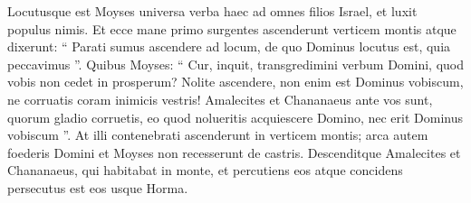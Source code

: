 \begin{biblechapter}
\begin{biblechapter}
\begin{biblechapter}
\begin{biblechapter}
\begin{biblechapter}
\begin{biblechapter}
\begin{biblechapter}
\begin{biblechapter}
\begin{biblechapter}
\begin{biblechapter}
\begin{biblechapter}
\begin{biblechapter}
\begin{biblechapter}
\begin{biblechapter}
 \verse Locutusque est Moyses universa verba haec ad omnes filios Israel, et luxit populus nimis. 
\verse Et ecce mane primo surgentes ascenderunt verticem montis atque dixerunt: “ Parati sumus ascendere ad locum, de quo Dominus locutus est, quia peccavimus ”. 
\verse Quibus Moyses: “ Cur, inquit, transgredimini verbum Domini, quod vobis non cedet in prosperum? 
\verse Nolite ascendere, non enim est Dominus vobiscum, ne corruatis coram inimicis vestris! 
\verse Amalecites et Chananaeus ante vos sunt, quorum gladio corruetis, eo quod nolueritis acquiescere Domino, nec erit Dominus vobiscum ”. 
\verse At illi contenebrati ascenderunt in verticem montis; arca autem foederis Domini et Moyses non recesserunt de castris. 
\verse Descenditque Amalecites et Chananaeus, qui habitabat in monte, et percutiens eos atque concidens persecutus est eos usque Horma.
 

\end{biblechapter}
\end{biblechapter}
\end{biblechapter}
\end{biblechapter}
\end{biblechapter}
\end{biblechapter}
\end{biblechapter}
\end{biblechapter}
\end{biblechapter}
\end{biblechapter}
\end{biblechapter}
\end{biblechapter}
\end{biblechapter}
\end{biblechapter}
